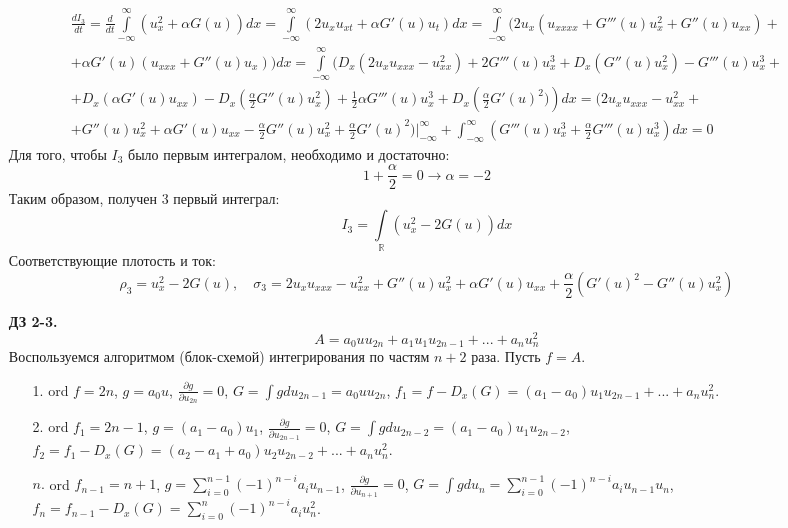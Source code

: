 \documentclass[12pt]{article}
\theoremstyle{definition}
\begin{document}
\begin{itemize}
\begin{multline*}
        \frac{dI_3}{dt}=\frac{d}{dt}\int\limits_{-\infty}^\infty(u_x^2+\alpha  G(u))dx=\int\limits_{-\infty}^\infty(2u_xu_{xt}+\alpha G'(u)u_t)dx=\int\limits_{-\infty}^\infty(2u_x(u_{xxxx}+G'''(u)u_x^2+G''(u)u_{xx})+\\
        +\alpha G'(u)(u_{xxx}+G''(u)u_x))dx=\int\limits_{-\infty}^\infty (D_x(2u_xu_{xxx}-u_{xx}^2)+2G'''(u)u_x^3+D_x(G''(u)u_x^2)-G'''(u)u_x^3+\\+D_x(\alpha G'(u)u_{xx})-D_x\left(\frac{\alpha}{2}G''(u)u_x^2\right)+\frac{1}{2}\alpha G'''(u)u_x^3+D_x\left(\frac{\alpha}{2}G'(u)^2)\right)dx=(2u_xu_{xxx}-u_{xx}^2+\\
        +G''(u)u_x^2+\alpha G'(u)u_{xx}-\frac{\alpha}{2} G''(u)u_x^2+\frac{\alpha}{2} G'(u)^2)|_{-\infty}^\infty+\int_{-\infty}^\infty \left(G'''(u)u_x^3+\frac{\alpha}{2}G'''(u)u_x^3\right)dx=0
    \end{multline*}
    Для того, чтобы $I_3$ было первым интегралом, необходимо и достаточно:
    \begin{equation}
        1+\frac{\alpha}{2}=0\rightarrow \alpha=-2
    \end{equation}
    Таким образом, получен 3 первый интеграл:
    \begin{equation}
        \boxed{I_3=\int\limits_\mathbb{R}(u_x^2-2G(u))dx}
    \end{equation}
    Соответствующие плотость и ток:
    \begin{equation*}
        \boxed{\rho_3=u_x^2-2G(u), \quad \sigma_3=2u_xu_{xxx}-u_{xx}^2+G''(u)u_x^2+\alpha G'(u)u_{xx}+\frac{\alpha}{2}(G'(u)^2-G''(u)u_x^2)}
    \end{equation*}
    \item[\textbf{ДЗ 2-3.}]
    \begin{equation}
        A=a_0uu_{2n}+a_1u_1u_{2n-1}+...+a_nu_n^2
    \end{equation}
    Воспользуемся алгоритмом (блок-схемой) интегрирования по частям $n+2$ раза. Пусть $f=A$.
    \begin{itemize}
        \item[1.] ord $f=2n$, $g=a_0u$, $\frac{\partial g}{\partial u_{2n}}=0$, $G=\int gdu_{2n-1}=a_0uu_{2n}$, $f_1=f-D_x(G)=(a_1-a_0)u_1u_{2n-1}+...+a_nu_n^2$.
        \item[2.] ord $f_1=2n-1$, $g=(a_1-a_0)u_1$, $\frac{\partial g}{\partial u_{2n-1}}=0$, $G=\int gdu_{2n-2}=(a_1-a_0)u_1u_{2n-2}$, $f_2=f_1-D_x(G)=(a_2-a_1+a_0)u_2u_{2n-2}+...+a_nu_n^2$.
        \item[$n$.] ord $f_{n-1}=n+1$, $g=\sum\limits_{i=0}^{n-1} (-1)^{n-i}a_iu_{n-1}$, $\frac{\partial g}{\partial u_{n+1}}=0$, $G=\int gdu_n=\sum\limits_{i=0}^{n-1} (-1)^{n-i}a_iu_{n-1}u_n$, $f_n=f_{n-1}-D_x(G)=\sum\limits_{i=0}^n (-1)^{n-i}a_iu_n^2$.

\end{itemize}
\end{itemize}
\end{document}
